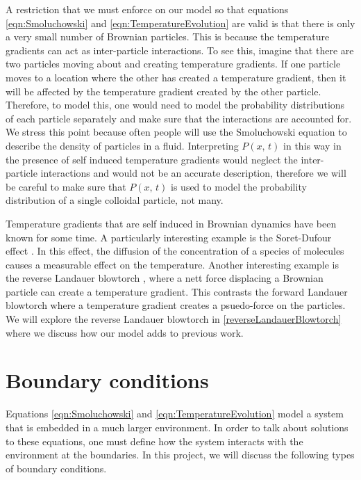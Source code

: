 A restriction that we must enforce on our model so that equations \ref{eqn:Smoluchowski} and \ref{eqn:TemperatureEvolution} are valid is that there is only a very small number of Brownian particles. This is because the temperature gradients can act as inter-particle interactions. To see this, imagine that there are two particles moving about and creating temperature gradients. If one particle moves to a location where the other has created a temperature gradient, then it will be affected by the temperature gradient created by the other particle. Therefore, to model this, one would need to model the probability distributions of each particle separately and make sure that the interactions are accounted for. We stress this point because often people will use the Smoluchowski equation to describe the density of particles in a fluid. Interpreting $P(x, \, t)$ in this way in the presence of self induced temperature gradients would neglect the inter-particle interactions and would not be an accurate description, therefore we will be careful to make sure that $P(x, \, t)$ is used to model the probability distribution of a single colloidal particle, not many.  


Temperature gradients that are self induced in Brownian dynamics have been known for some time. A particularly interesting example is the Soret-Dufour effect \cite{Onsager1931,HortLinzLuecke1992,PiazzaGuarino2002,Santamaria-HolekGadomskiRubi2011}. In this effect, the diffusion of the concentration of a species of molecules causes a measurable effect on the temperature. Another interesting example is the reverse Landauer blowtorch \cite{DasDasBarikEtAl2015}, where a nett force displacing a Brownian particle can create a temperature gradient. This contrasts the forward Landauer blowtorch where a temperature gradient creates a psuedo-force on the particles. We will explore the reverse Landauer blowtorch in \autoref{reverseLandauerBlowtorch} where we discuss how our model adds to previous work.

\section{Boundary conditions}
Equations \ref{eqn:Smoluchowski} and \ref{eqn:TemperatureEvolution} model a system that is embedded in a much larger environment. In order to talk about solutions to these equations, one must define how the system interacts with the environment at the boundaries. In this project, we will discuss the following types of boundary conditions.

